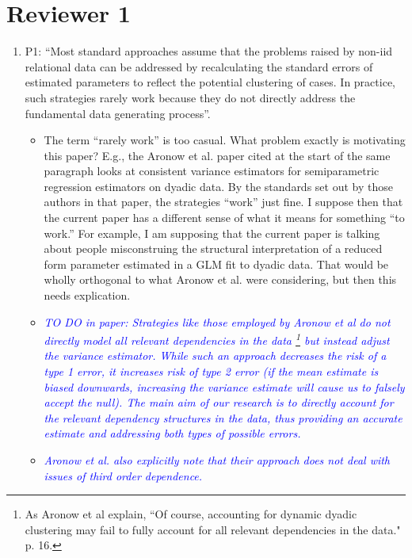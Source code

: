 \section*{Reviewer 1}

\begin{enumerate}
	\item P1: ``Most standard approaches assume that the problems raised by non-iid relational data can be addressed by recalculating the standard errors of estimated parameters to reflect the potential clustering of cases. In practice, such strategies rarely work because they do not directly address the fundamental data generating process''.
	\begin{itemize}
		\item The term “rarely work” is too casual.  What problem exactly is motivating this paper?  E.g., the Aronow et al. paper cited at the start of the same paragraph looks at consistent variance estimators for semiparametric regression estimators on dyadic data. By the standards set out by those authors in that paper, the strategies “work” just fine.  I suppose then that the current paper has a different sense of what it means for something “to work.” For example, I am supposing that the current paper is talking about people misconstruing the structural interpretation of a reduced form parameter estimated in a GLM fit to dyadic data.  That would be wholly orthogonal to what Aronow et al. were considering, but then this needs explication.
	\end{itemize}
	\begin{itemize}
		\item \textcolor{blue}{ \emph{
		TO DO in paper: Strategies like those employed by Aronow et al do not directly model all relevant dependencies in the data \footnote{As Aronow et al explain, “Of course, accounting for dynamic dyadic clustering may fail to fully account for all relevant dependencies in the data." p. 16.} but instead adjust the variance estimator.  While such an approach decreases the risk of a type 1 error, it increases risk of type 2 error (if the mean estimate is biased downwards, increasing the variance estimate will cause us to falsely accept the null). The main aim of our research is to directly account for the relevant dependency structures in the data, thus providing an accurate estimate and addressing both types of possible errors.
		}}
		\item \textcolor{blue}{ \emph{
		Aronow et al. also explicitly note that their approach does not deal with issues of third order dependence.
}}
\end{itemize}
\end{enumerate}
